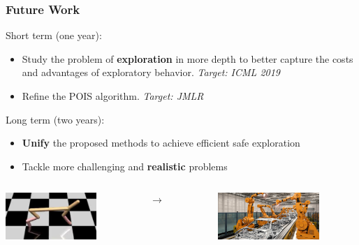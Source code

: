 \documentclass{beamer}
\begin{document}
\begin{frame}
\frametitle{Future Work}

Short term (one year):
\begin{itemize}
	\item Study the problem of \textbf{exploration} in more depth to better capture the costs and advantages of exploratory behavior.
	\textit{Target: ICML 2019}
	\item Refine the POIS algorithm. \textit{Target: JMLR}
\end{itemize}

\vfill

Long term (two years):
\begin{itemize}
	\item \textbf{Unify} the proposed methods to achieve efficient safe exploration
	\item Tackle more challenging and \textbf{realistic} problems
\end{itemize}

\vfill

\begin{columns}
	\begin{column}{0.35\textwidth}
		\includegraphics[height=50pt]{pics/cheetah.jpeg}
	\end{column}
	\begin{column}{0.1\textwidth}
		\centering
		\LARGE$\to$
	\end{column}
	\begin{column}{0.35\textwidth}
	\includegraphics[height=50pt]{pics/factory.jpg}
	\end{column}
\end{columns}

\end{frame}
\end{document}
